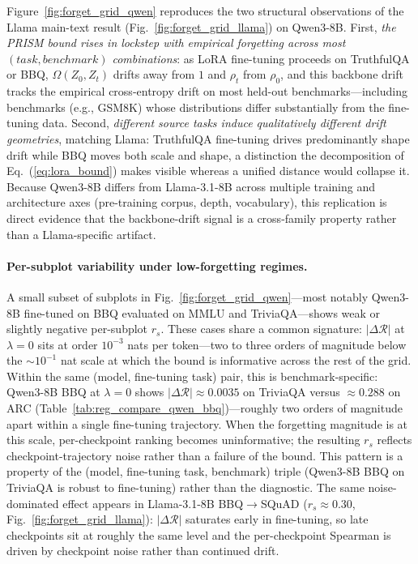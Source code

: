Figure~\ref{fig:forget_grid_qwen} reproduces the two structural observations of the Llama main-text result (Fig.~\ref{fig:forget_grid_llama}) on Qwen3-8B. First, \emph{the PRISM bound rises in lockstep with empirical forgetting across most $(task, benchmark)$ combinations}: as LoRA fine-tuning proceeds on TruthfulQA or BBQ, $\Omega(Z_0, Z_t)$ drifts away from $1$ and $\rho_t$ from $\rho_0$, and this backbone drift tracks the empirical cross-entropy drift on most held-out benchmarks---including benchmarks (e.g., GSM8K) whose distributions differ substantially from the fine-tuning data. Second, \emph{different source tasks induce qualitatively different drift geometries}, matching Llama: TruthfulQA fine-tuning drives predominantly shape drift while BBQ moves both scale and shape, a distinction the decomposition of Eq.~(\ref{eq:lora_bound}) makes visible whereas a unified distance would collapse it. Because Qwen3-8B differs from Llama-3.1-8B across multiple training and architecture axes (pre-training corpus, depth, vocabulary), this replication is direct evidence that the backbone-drift signal is a cross-family property rather than a Llama-specific artifact.

\paragraph{Per-subplot variability under low-forgetting regimes.}
A small subset of subplots in Fig.~\ref{fig:forget_grid_qwen}---most notably Qwen3-8B fine-tuned on BBQ evaluated on MMLU and TriviaQA---shows weak or slightly negative per-subplot $r_s$. These cases share a common signature: $|\Delta\mathcal{R}|$ at $\lambda{=}0$ sits at order $10^{-3}$ nats per token---two to three orders of magnitude below the $\sim 10^{-1}$ nat scale at which the bound is informative across the rest of the grid. Within the same (model, fine-tuning task) pair, this is benchmark-specific: Qwen3-8B BBQ at $\lambda{=}0$ shows $|\Delta\mathcal{R}|{\approx}0.0035$ on TriviaQA versus ${\approx}0.288$ on ARC (Table~\ref{tab:reg_compare_qwen_bbq})---roughly two orders of magnitude apart within a single fine-tuning trajectory. When the forgetting magnitude is at this scale, per-checkpoint ranking becomes uninformative; the resulting $r_s$ reflects checkpoint-trajectory noise rather than a failure of the bound. This pattern is a property of the (model, fine-tuning task, benchmark) triple (Qwen3-8B BBQ on TriviaQA is robust to fine-tuning) rather than the diagnostic. The same noise-dominated effect appears in Llama-3.1-8B BBQ$\to$SQuAD ($r_s\approx 0.30$, Fig.~\ref{fig:forget_grid_llama}): $|\Delta\mathcal{R}|$ saturates early in fine-tuning, so late checkpoints sit at roughly the same level and the per-checkpoint Spearman is driven by checkpoint noise rather than continued drift.

